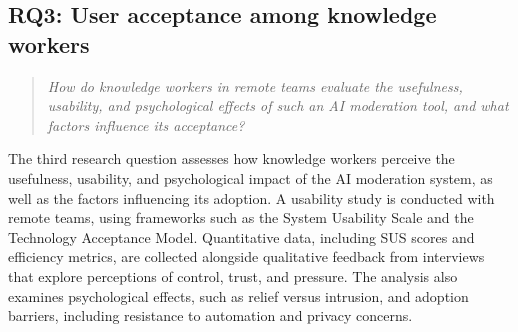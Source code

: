 \subsection{RQ3: User acceptance among knowledge workers}
\begin{quote}
  \textit{How do knowledge workers in remote teams evaluate the usefulness, usability, and psychological
  effects of such an AI moderation tool, and what factors influence its acceptance?}
\end{quote}
The third research question assesses how knowledge workers perceive the usefulness, usability, and
psychological impact of the AI moderation system, as well as the factors influencing its adoption. A
usability study is conducted with remote teams, using frameworks such as the System Usability Scale and the
Technology Acceptance Model. Quantitative data, including SUS scores and efficiency metrics, are collected
alongside qualitative feedback from interviews that explore perceptions of control, trust, and pressure. The
analysis also examines psychological effects, such as relief versus intrusion, and adoption barriers,
including resistance to automation and privacy concerns.